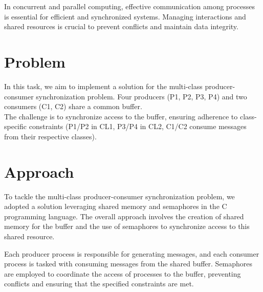 In concurrent and parallel computing, 
effective communication among processes is essential for efficient and synchronized systems. 
Managing interactions and shared resources is crucial to prevent conflicts and maintain data integrity.
\section{Problem}
In this task, we aim to implement a solution for the multi-class producer-consumer synchronization problem. Four producers (P1, P2, P3, P4) and two consumers (C1, C2) share a common buffer.\\
The challenge is to synchronize access to the buffer, ensuring adherence to class-specific constraints (P1/P2 in CL1, P3/P4 in CL2, C1/C2 consume messages from their respective classes).

\section{Approach}
To tackle the multi-class producer-consumer synchronization problem, we adopted a solution leveraging shared memory and semaphores in the C programming language. The overall approach involves the creation of shared memory for the buffer and the use of semaphores to synchronize access to this shared resource.

Each producer process is responsible for generating messages, and each consumer process is tasked with consuming messages from the shared buffer. Semaphores are employed to coordinate the access of processes to the buffer, preventing conflicts and ensuring that the specified constraints are met.
